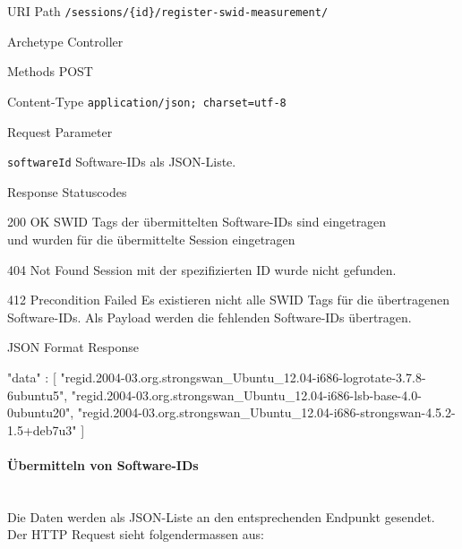 \begin{mdframed}[style=def]
\begin{description*}
	\item[URI Path] \texttt{/sessions/\{id\}/register-swid-measurement/}
	\item[Archetype] Controller
	\item[Methods] POST
	\item[Content-Type] \texttt{application/json; charset=utf-8}
	\item[Request Parameter] \hfill
	\begin{description*}
		\item[\texttt{softwareId}] Software-IDs als JSON-Liste.
	\end{description*}
	\item[Response Statuscodes] \hfill
		\begin{description*}
			\item[200 OK] SWID Tags der übermittelten Software-IDs sind eingetragen \\
				und wurden für die übermittelte Session eingetragen
			\item[404 Not Found] Session mit der spezifizierten ID wurde nicht gefunden. 
			\item[412 Precondition Failed] Es existieren nicht alle SWID Tags für die
				übertragenen Software-IDs. Als Payload werden die fehlenden Software-IDs
				übertragen.
		\end{description*}
	\item[JSON Format Response] \hfill
	
\begin{jsoncode}
{"data" : 
	[
		"regid.2004-03.org.strongswan_Ubuntu_12.04-i686-logrotate-3.7.8-6ubuntu5",
		"regid.2004-03.org.strongswan_Ubuntu_12.04-i686-lsb-base-4.0-0ubuntu20",
		"regid.2004-03.org.strongswan_Ubuntu_12.04-i686-strongswan-4.5.2-1.5+deb7u3" 
	]
}
\end{jsoncode}
\end{description*}
\end{mdframed}

\paragraph{Übermitteln von Software-IDs} \hspace{0pt} \\
Die Daten werden als JSON-Liste an den entsprechenden Endpunkt gesendet.
Der HTTP Request sieht folgendermassen aus:

